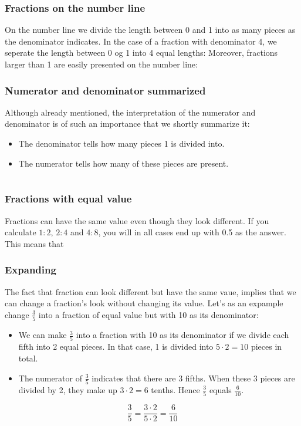 \newpage
\subsubsection{Fractions on the number line}
On the number line we divide the length between 0 and 1 into as many pieces as the denominator indicates. In the case of a fraction with denominator 4, we seperate the length between 0 og 1 into 4 equal lengths:
Moreover, fractions larger than 1 are easily presented on the number line:
\subsubsection{Numerator and denominator summarized}
Although already mentioned, the interpretation of the numerator and denominator is of such an importance that we shortly summarize it:
\begin{itemize}
	\item The denominator tells how many pieces 1 is divided into.
	\item The numerator tells how many of these pieces are present.
\end{itemize}
\newpage
\section{\brvu}
\subsubsection{Fractions with equal value}
Fractions can have the same value even though they look different. If you calculate $ 1:2 $, $ 2:4 $ and $ 4:8 $, you will in all cases end up with 0.5 as the answer. This means that
 \\[5pt]
 \vsk
{}
\subsubsection{Expanding}
The fact that fraction can look different but have the same vaue, implies that we can change a fraction's look without changing its value. Let's as an expample change $ \frac{3}{5} $ into a fraction of equal value but with 10 as its denominator:
\begin{itemize}
	\item We can make $ \frac{3}{5} $ into a fraction with 10 as its denominator if we divide each fifth into 2 equal pieces. In that case, 1 is divided into $ {5\cdot2=10} $ pieces in total.
	\item The numerator of $ \frac{3}{5} $ indicates that there are 3 fifths. When these 3 pieces are divided by 2, they make up $ 3\cdot2=6 $ tenths. Hence $ \frac{3}{5} $ equals $ \frac{6}{10} $.
\end{itemize}
\[ \frac{3}{5}=\frac{3\cdot2}{5\cdot2}=\frac{6}{10} \]

